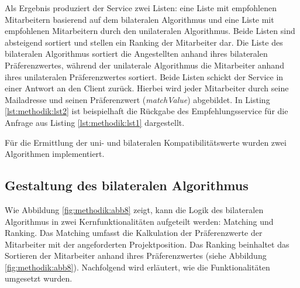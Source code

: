 Als Ergebnis produziert der Service zwei Listen: eine Liste mit empfohlenen Mitarbeitern basierend auf dem bilateralen Algorithmus und eine Liste mit empfohlenen Mitarbeitern durch den unilateralen Algorithmus.
Beide Listen sind absteigend sortiert und stellen ein Ranking der Mitarbeiter dar.
Die Liste des bilateralen Algorithmus sortiert die Angestellten anhand ihres bilateralen Präferenzwertes, während der unilaterale Algorithmus die Mitarbeiter anhand ihres unilateralen Präferenzwertes sortiert.
Beide Listen schickt der Service in einer Antwort an den Client zurück.
Hierbei wird jeder Mitarbeiter durch seine Mailadresse und seinen Präferenzwert (\textit{matchValue}) abgebildet.
In Listing \ref{lst:methodik:lst2} ist beispielhaft die Rückgabe des Empfehlungsservice für die Anfrage aus Listing \ref{lst:methodik:lst1} dargestellt.



Für die Ermittlung der uni- und bilateralen Kompatibilitätswerte wurden zwei Algorithmen implementiert.


\subsection{Gestaltung des bilateralen Algorithmus}
Wie Abbildung \ref{fig:methodik:abb8} zeigt, kann die Logik des bilateralen Algorithmus in zwei Kernfunktionalitäten aufgeteilt werden: Matching und Ranking.
Das Matching umfasst die Kalkulation der Präferenzwerte der Mitarbeiter mit der angeforderten Projektposition.
Das Ranking beinhaltet das Sortieren der Mitarbeiter anhand ihres Präferenzwertes (siehe Abbildung \ref{fig:methodik:abb8}).
Nachfolgend wird erläutert, wie die Funktionalitäten umgesetzt wurden.


